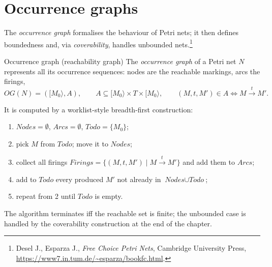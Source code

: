 \section{Occurrence graphs}

The \emph{occurrence graph} formalises the behaviour of Petri nets; it then defines boundedness and, via \emph{coverability}, handles unbounded nets.\footnote{Desel J., Esparza J., \emph{Free Choice Petri Nets}, Cambridge University Press, \url{https://www7.in.tum.de/~esparza/bookfc.html}.}

\begin{definitionbox}{Occurrence graph (reachability graph)}
The \emph{occurrence graph} of a Petri net $N$ represents all its occurrence sequences: nodes are the reachable markings, arcs the firings,
\[
  OG(N) = ([M_0\rangle, A), \qquad A \subseteq [M_0\rangle \times T \times [M_0\rangle, \qquad (M, t, M') \in A \iff M \xrightarrow{t} M'.
\]
\end{definitionbox}

It is computed by a worklist-style breadth-first construction:
\begin{enumerate}
  \item $\textit{Nodes} = \emptyset$, $\textit{Arcs} = \emptyset$, $\textit{Todo} = \{M_0\}$;
  \item pick $M$ from $\textit{Todo}$; move it to $\textit{Nodes}$;
  \item collect all firings $\textit{Firings} = \{(M, t, M') \mid M \xrightarrow{t} M'\}$ and add them to $\textit{Arcs}$;
  \item add to $\textit{Todo}$ every produced $M'$ not already in $\textit{Nodes} \cup \textit{Todo}$;
  \item repeat from 2 until $\textit{Todo}$ is empty.
\end{enumerate}
The algorithm terminates iff the reachable set is finite; the unbounded case is handled by the coverability construction at the end of the chapter.

